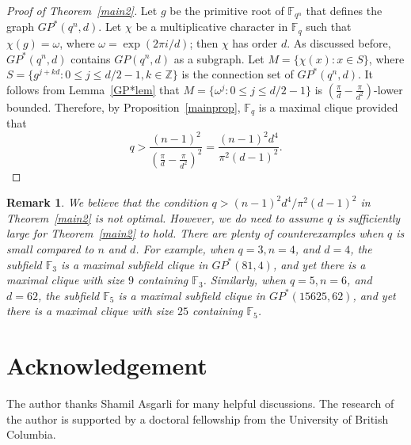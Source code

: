 \documentclass[12pt,reqno]{amsart}
\newtheorem{rem}[thm]{Remark}
\newcommand{\Z}{\mathbb{Z}}
\newcommand{\F}{\mathbb{F}}
\begin{document}
\begin{proof}[Proof of Theorem~\ref{main2}]
Let $g$ be the primitive root of $\F_{q^n}$ that defines the graph $GP^*(q^n,d)$. Let $\chi$ be a multiplicative character in $\F_q$ such that $\chi(g)=\omega$, where $\omega=\exp(2\pi i/d)$; then $\chi$ has order $d$. As discussed before, $GP^*(q^n,d)$ contains $GP(q^n,d)$ as a subgraph.  Let $M=\{\chi(x): x \in S\}$, where $S=\{g^{j+kd}: 0 \leq j \leq d/2-1, k \in \Z\}$ is the connection set of $GP^*(q^n,d)$. It follows from Lemma~\ref{GP*lem} that $M=\{\omega^j :0 \leq j \leq d/2-1\}$ is $\left(\frac{\pi}{d}-\frac{\pi}{d^2}\right)$-lower bounded. Therefore, by Proposition~\ref{mainprop}, $\F_q$ is a maximal clique provided that
$$
q>\frac{(n-1)^2}{\left(\frac{\pi}{d}-\frac{\pi}{d^2}\right)^2}=\frac{(n-1)^2d^4}{\pi^2(d-1)^2}.
$$
\end{proof}
\begin{rem}\rm
We believe that the condition $q>(n-1)^2d^4/\pi^2(d-1)^2$ in Theorem~\ref{main2} is not optimal. However, we do need to assume $q$ is sufficiently large for Theorem~\ref{main2} to hold. There are plenty of counterexamples when $q$ is small compared to $n$ and $d$. For example, when $q=3,n=4$, and $d=4$, the subfield $\F_3$ is a maximal subfield clique in $GP^*(81,4)$, and yet there is a maximal clique with size $9$ containing $\F_3$. Similarly, when $q=5,n=6$, and $d=62$, the subfield $\F_5$ is a maximal subfield clique in $GP^*(15625,62)$, and yet there is a maximal clique with size $25$ containing $\F_5$.
\end{rem}


\section*{Acknowledgement}
The author thanks Shamil Asgarli for many helpful discussions. The research of the author is supported by a doctoral fellowship from the University of British Columbia.
\end{document}
